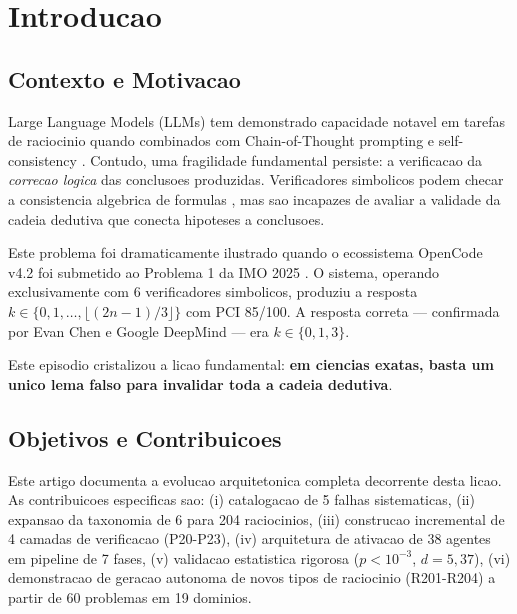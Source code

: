 \documentclass[5p]{elsarticle}
\begin{document}
\newpage
\tableofcontents
\newpage

\section{Introducao}

\subsection{Contexto e Motivacao}

Large Language Models (LLMs) tem demonstrado capacidade notavel em tarefas de
raciocinio quando combinados com Chain-of-Thought prompting \cite{wei2022} e
self-consistency \cite{wang2023}. Contudo, uma fragilidade fundamental persiste:
a verificacao da \textit{correcao logica} das conclusoes produzidas. Verificadores
simbolicos podem checar a consistencia algebrica de formulas \cite{meurer2017},
mas sao incapazes de avaliar a validade da cadeia dedutiva que conecta hipoteses
a conclusoes.

Este problema foi dramaticamente ilustrado quando o ecossistema OpenCode v4.2
\cite{opencode2026} foi submetido ao Problema 1 da IMO 2025 \cite{imo2025}. O
sistema, operando exclusivamente com 6 verificadores simbolicos, produziu a
resposta $k\in\{0,1,\dots,\lfloor(2n-1)/3\rfloor\}$ com PCI 85/100. A resposta
correta --- confirmada por Evan Chen \cite{chen2025} e Google DeepMind
\cite{deepmind2025} --- era $k\in\{0,1,3\}$.

Este episodio cristalizou a licao fundamental: \textbf{em ciencias exatas, basta
um unico lema falso para invalidar toda a cadeia dedutiva}.

\subsection{Objetivos e Contribuicoes}

Este artigo documenta a evolucao arquitetonica completa decorrente desta licao.
As contribuicoes especificas sao: (i) catalogacao de 5 falhas sistematicas,
(ii) expansao da taxonomia de 6 para 204 raciocinios, (iii) construcao
incremental de 4 camadas de verificacao (P20-P23), (iv) arquitetura de ativacao
de 38 agentes em pipeline de 7 fases, (v) validacao estatistica rigorosa
($p<10^{-3}$, $d=5,37$), (vi) demonstracao de geracao autonoma de novos tipos
de raciocinio (R201-R204) a partir de 60 problemas em 19 dominios.
\end{document}
